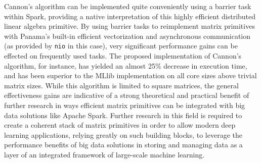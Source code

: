 \documentclass[bdcc,article,submit,moreauthors,pdftex]{Definitions/mdpi}
\begin{document}
Cannon's algorithm can be implemented quite conveniently using a barrier task within Spark, providing a native interpretation of this highly efficient distributed linear algebra primitive. By using barrier tasks to reimplement matrix primitives with Panama's built-in efficient vectorization and asynchronous communication (as provided by \texttt{nio} in this case), very significant performance gains can be effected on frequently used tasks. The proposed implementation of Cannon's algorithm, for instance, has yielded an almost 25\% decrease in execution time, and has been superior to the MLlib implementation on all core sizes above trivial matrix sizes. While this algorithm is limited to square matrices, the general effectiveness gains are indicative of a strong theoretical and practical benefit of further research in ways efficient matrix primitives can be integrated with big data solutions like Apache Spark. Further research in this field is required to create a coherent stack of matrix primitives in order to allow modern deep learning applications, relying greatly on such building blocks, to leverage the performance benefits of big data solutions in storing and managing data as a layer of an integrated framework of large-scale machine learning.


\vspace{6pt} 



\end{document}

